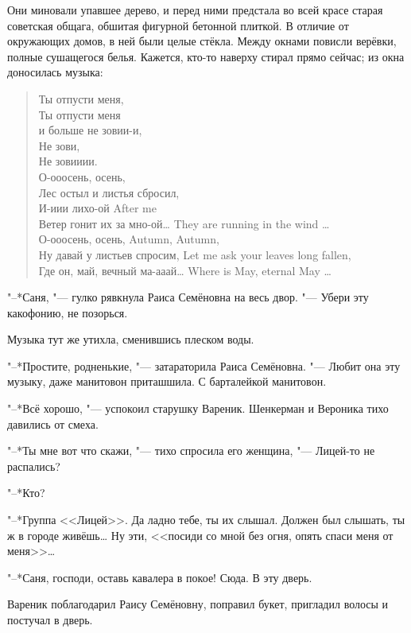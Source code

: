 Они миновали упавшее дерево, и перед ними предстала во всей красе старая советская общага, обшитая фигурной бетонной плиткой.
В отличие от окружающих домов, в ней были целые стёкла.
Между окнами повисли верёвки, полные сушащегося белья.
Кажется, кто-то наверху стирал прямо сейчас;
из окна доносилась музыка:

\begin{quote}
Ты отпусти меня,\\
Ты отпусти меня\\
и больше не зовии-и,\\
Не зови,\\
Не зовииии.\\
О-ооосень, осень,\\
Лес остыл и листья сбросил,\\
{И-иии лихо-ой}
{After me}\\
{Ветер гонит их за мно-ой\ldots{}}
{They are running in the wind \ldots{}}\\
{О-ооосень, осень,}
{Autumn, Autumn,}\\
{Ну давай у листьев спросим,}
{Let me ask your leaves long fallen,}\\
{Где он, май, вечный ма-ааай\ldots{}}
{Where is May, eternal May \ldots{}}
\end{quote}

"--*Саня, "--- гулко рявкнула Раиса Семёновна на весь двор.
"--- Убери эту какофонию, не позорься.

Музыка тут же утихла, сменившись плеском воды.

"--*Простите, родненькие, "--- затараторила Раиса Семёновна.
"--- Любит она эту музыку, даже манитовон приташшила.
С барталейкой манитовон.

"--*Всё хорошо, "--- успокоил старушку Вареник.
Шенкерман и Вероника тихо давились от смеха.

\asterism

\textspace

"--*Ты мне вот что скажи, "--- тихо спросила его женщина, "--- Лицей-то не распались?

"--*Кто?

"--*Группа <<Лицей>>.
Да ладно тебе, ты их слышал.
Должен был слышать, ты ж в городе живёшь\ldots{}
Ну эти, <<посиди со мной без огня, опять спаси меня от меня>>\ldots{}

"--*Саня, господи, оставь кавалера в покое!
Сюда.
В эту дверь.

Вареник поблагодарил Раису Семёновну, поправил букет, пригладил волосы и постучал в дверь.

